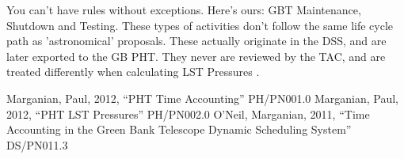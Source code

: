 \documentclass{article}
\begin{document}
You can't have rules without exceptions.  Here's ours:  GBT Maintenance,
Shutdown and Testing.  These types of activities don't follow the same life
cycle path as 'astronomical' proposals.  These actually originate in the DSS,
and are later exported to the GB PHT.  They never are reviewed by the TAC, and
are treated differently when calculating LST Pressures \cite{marganian12b}.


\begin{thebibliography}{}
  Marganian, Paul, 2012, ``PHT Time Accounting''
  PH/PN001.0
  Marganian, Paul, 2012, ``PHT LST Pressures''
  PH/PN002.0
  O'Neil, Marganian, 2011, ``Time Accounting in the Green Bank Telescope Dynamic Scheduling
System''
  DS/PN011.3
\end{thebibliography}{}
\end{document}
